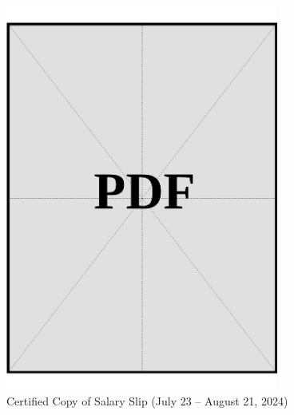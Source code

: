 \begin{figure}[h]
    \centering
    \includegraphics[page=1, width=0.8\textwidth]{../application-docs/applicant/funds/salary-slips/month-3/certified-copies.pdf}
    \caption{Certified Copy of Salary Slip (July 23 – August 21, 2024)}
    \label{fig:month-3-certified}
\end{figure}

\vspace*{\fill}
\clearpage
